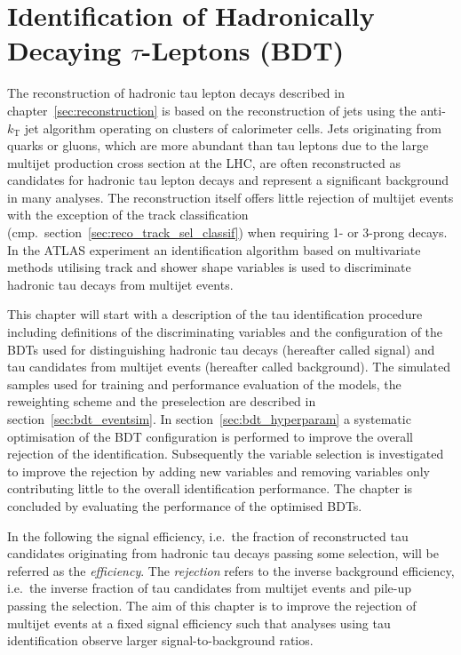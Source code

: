 \chapter{Identification of Hadronically Decaying $\tau$-Leptons (BDT)}
\label{sec:bdt}
The reconstruction of hadronic tau lepton decays described in
chapter~\ref{sec:reconstruction} is based on the reconstruction of jets using
the anti-$k_\text{T}$ jet algorithm operating on clusters of calorimeter cells.
Jets originating from quarks or gluons, which are more abundant than tau leptons
due to the large multijet production cross section at the LHC, are often
reconstructed as candidates for hadronic tau lepton decays and represent a
significant background in many analyses. The reconstruction itself offers little
rejection of multijet events with the exception of the track classification
(cmp.\ section~\ref{sec:reco_track_sel_classif}) when requiring 1- or 3-prong
decays. In the ATLAS experiment an identification algorithm based on
multivariate methods utilising track and shower shape variables is used to
discriminate hadronic tau decays from multijet events.

This chapter will start with a description of the tau identification procedure
including definitions of the discriminating variables and the configuration of
the BDTs used for distinguishing hadronic tau decays (hereafter called signal)
and tau candidates from multijet events (hereafter called background). The
simulated samples used for training and performance evaluation of the models,
the reweighting scheme and the preselection are described in
section~\ref{sec:bdt_eventsim}. In section~\ref{sec:bdt_hyperparam} a systematic
optimisation of the BDT configuration is performed to improve the overall
rejection of the identification. Subsequently the variable selection is
investigated to improve the rejection by adding new variables and removing
variables only contributing little to the overall identification performance.
The chapter is concluded by evaluating the performance of the optimised BDTs.

In the following the signal efficiency, i.e.\ the fraction of reconstructed tau
candidates originating from hadronic tau decays passing some selection, will be
referred as the \emph{efficiency}. The \emph{rejection} refers to the inverse
background efficiency, i.e.\ the inverse fraction of tau candidates from
multijet events and pile-up passing the selection. The aim of this chapter is to
improve the rejection of multijet events at a fixed signal efficiency such that
analyses using tau identification observe larger signal-to-background ratios.

